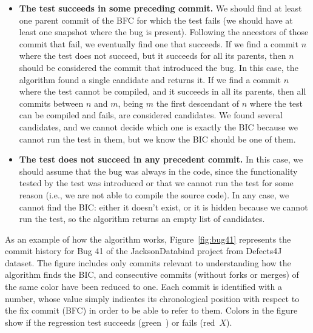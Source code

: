 \begin{itemize}
\item \textbf{The test succeeds in some preceding commit.}
  We should find at least one parent commit of the BFC for which the test fails (we should have at least one snapshot where the bug is present). 
  Following the ancestors of those commit that fail, we eventually find one that succeeds. 
  If we find a commit $n$ where the test does not succeed, but it succeeds for all its parents, then $n$ should be considered the commit that introduced the bug. 
  In this case, the algorithm found a single candidate and returns it. If we find a commit $n$ where the test cannot be compiled, and it succeeds in all its parents, then all commits between $n$ and $m$, being $m$ the first descendant of $n$ where the test can be compiled and fails, are considered candidates. 
  We found several candidates, and we cannot decide which one is exactly the BIC because we cannot run the test in them, but we know the BIC should be one of them.
\item \textbf{The test does not succeed in any precedent commit.}
  In this case, we should assume that the bug was always in the code, since the functionality tested by the test was introduced or that we cannot run the test for some reason (i.e., we are not able to compile the source code). In any case, we cannot find the BIC: either it doesn't exist, or it is hidden because we cannot run the test, so the algorithm returns an empty list of candidates.
\end{itemize}

As an example of how the algorithm works, Figure~\ref{fig:bug41} represents the commit history for Bug 41 of the JacksonDatabind project from Defects4J dataset. 
The figure includes only commits relevant to understanding how the algorithm finds the BIC, and consecutive commits (without forks or merges) of the same color have been reduced to one. 
Each commit is identified with a number, whose value simply indicates its chronological position with respect to the fix commit (BFC) in order to be able to refer to them.
Colors in the figure show if the regression test succeeds (green~\checkmark) or fails (red~$X$).

